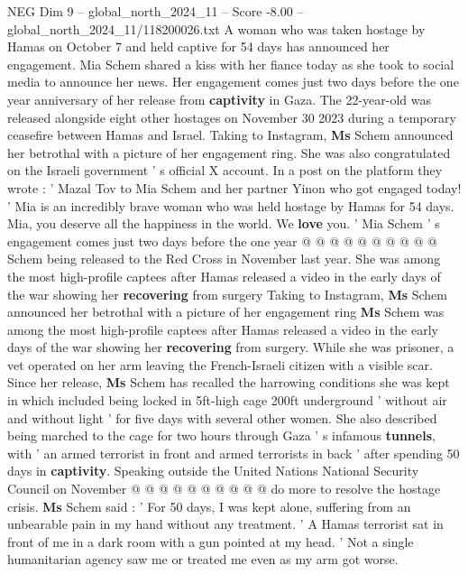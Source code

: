 \begin{textsample}{NEG Dim 9 – global\_north\_2024\_11 – Score -8.00 – global\_north\_2024\_11/118200026.txt}  \label{ex:f9_neg_202}
A woman who was taken hostage by Hamas on October 7 and held captive for 54 days has announced her engagement.
Mia Schem shared a kiss with her fiance today as she took to social media to announce her news.
Her engagement comes just two days before the one year anniversary of her release from \textbf{captivity} in Gaza.
The 22-year-old was released alongside eight other hostages on November 30 2023 during a temporary ceasefire between Hamas and Israel.
Taking to Instagram, \textbf{Ms} Schem announced her betrothal with a picture of her engagement ring.
She was also congratulated on the Israeli government ' s official X account.
In a post on the platform they wrote : ' Mazal Tov to Mia Schem and her partner Yinon who got engaged today! ' Mia is an incredibly brave woman who was held hostage by Hamas for 54 days.
Mia, you deserve all the happiness in the world.
We \textbf{love} you. ' Mia Schem ' s engagement comes just two days before the one year @ @ @ @ @ @ @ @ @ @ Schem being released to the Red Cross in November last year.
She was among the most high-profile captees after Hamas released a video in the early days of the war showing her \textbf{recovering} from surgery Taking to Instagram, \textbf{Ms} Schem announced her betrothal with a picture of her engagement ring \textbf{Ms} Schem was among the most high-profile captees after Hamas released a video in the early days of the war showing her \textbf{recovering} from surgery.
While she was prisoner, a vet operated on her arm leaving the French-Israeli citizen with a visible scar.
Since her release, \textbf{Ms} Schem has recalled the harrowing conditions she was kept in which included being locked in 5ft-high cage 200ft underground ' without air and without light ' for five days with several other women.
She also described being marched to the cage for two hours through Gaza ' s infamous \textbf{tunnels}, with ' an armed terrorist in front and armed terrorists in back ' after spending 50 days in \textbf{captivity}.
Speaking outside the United Nations National Security Council on November @ @ @ @ @ @ @ @ @ @ do more to resolve the hostage crisis. \textbf{Ms} Schem said : ' For 50 days, I was kept alone, suffering from an unbearable pain in my hand without any treatment. ' A Hamas terrorist sat in front of me in a dark room with a gun pointed at my head. ' Not a single humanitarian agency saw me or treated me even as my arm got worse.

\end{textsample}
